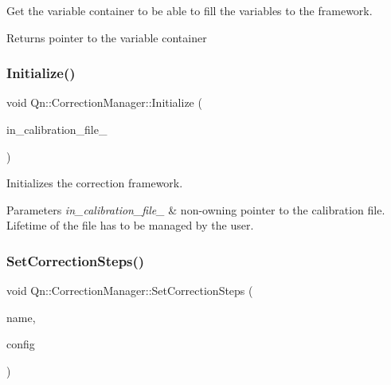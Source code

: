 Get the variable container to be able to fill the variables to the framework. 

\begin{DoxyReturn}{Returns}
pointer to the variable container 
\end{DoxyReturn}
\mbox{\label{classQn_1_1CorrectionManager_a1514c4ed8e0dac7ab67fe07ca092a263}} 
\subsubsection{\texorpdfstring{Initialize()}{Initialize()}}
{\footnotesize\ttfamily void Qn\+::\+Correction\+Manager\+::\+Initialize (\begin{DoxyParamCaption}\item[{T\+File $\ast$}]{in\+\_\+calibration\+\_\+file\+\_\+ }\end{DoxyParamCaption})}



Initializes the correction framework. 


\begin{DoxyParams}{Parameters}
{\em in\+\_\+calibration\+\_\+file\+\_\+} & non-\/owning pointer to the calibration file. Lifetime of the file has to be managed by the user. \\
\hline
\end{DoxyParams}
\mbox{\label{classQn_1_1CorrectionManager_afd73a6b73c0fae1da79c394328c86882}} 
\subsubsection{\texorpdfstring{Set\+Correction\+Steps()}{SetCorrectionSteps()}}
{\footnotesize\ttfamily void Qn\+::\+Correction\+Manager\+::\+Set\+Correction\+Steps (\begin{DoxyParamCaption}\item[{const std\+::string \&}]{name,  }\item[{std\+::function$<$ void(\mbox{\hyperlink{classQn_1_1DetectorConfiguration}{Detector\+Configuration}} $\ast$config)$>$}]{config }\end{DoxyParamCaption})}




